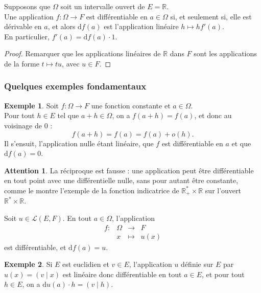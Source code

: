 \documentclass[french]{article}
\newcommand{\R}{\mathbb{R}}
\newcommand{\st}{^*}
\renewcommand{\d}{\text{d}}
\theoremstyle{plain}
\theoremstyle{definition}
\newtheorem*{ex}{Exemple}
\newtheorem*{attention}{Attention}
\theoremstyle{remark}
\begin{document}
\begin{prop}%
	Supposons que $\Omega$ soit un intervalle ouvert de $E=\R$.\\
	Une application $f:\Omega\to F$ est différentiable en $a\in\Omega$ si, et seulement si, elle est dérivable en $a$, et alors $\d f(a)$ est l'application linéaire $h\mapsto hf'(a)$.\\
	En particulier, $f'(a)=\d f(a)\cdot 1$.
\end{prop}
\begin{proof}
	Remarquer que les applications linéaires de $\R$ dans $F$ sont les applications de la forme $t\mapsto tu$, avec $u\in F$.
\end{proof}

\subsubsection*{Quelques exemples fondamentaux}

\begin{ex}
	Soit $f:\Omega\to F$ une fonction constante et $a\in\Omega$.\\
	Pour tout $h\in E$ tel que $a+h\in\Omega$, on a $f(a+h)=f(a)$, et donc au voisinage de $0$ :
	$$f(a+h)=f(a)=f(a)+o(h).$$
	Il s'ensuit, l'application nulle étant linéaire, que $f$ est différentiable en $a$ et que $\d f(a)=0$.
\end{ex}

\begin{attention}
	La réciproque est fausse : une application peut être différentiable en tout point avec une différentielle nulle, sans pour autant être constante, comme le montre l'exemple de la fonction indicatrice de $\R_+\st\times\R$ sur l'ouvert $\R\st\times\R$.
\end{attention}

\begin{prop}%
	Soit $u\in\mathcal{L}(E,F)$. En tout $a\in\Omega$, l'application $$\begin{array}{lrcl}
		f:&\Omega&\longrightarrow&F\\
		&x&\longmapsto&u(x)
	\end{array}$$ est différentiable, et $\d f(a)=u$.
\end{prop}

\begin{ex}
	Si $E$ est euclidien et $v\in E$, l'application $u$ définie sur $E$ par $u(x)=(v\mid x)$ est linéaire donc différentiable en tout $a\in E$, et pour tout $h\in E$, on a $\d u(a)\cdot h=(v\mid h)$.
\end{ex}
\end{document}
